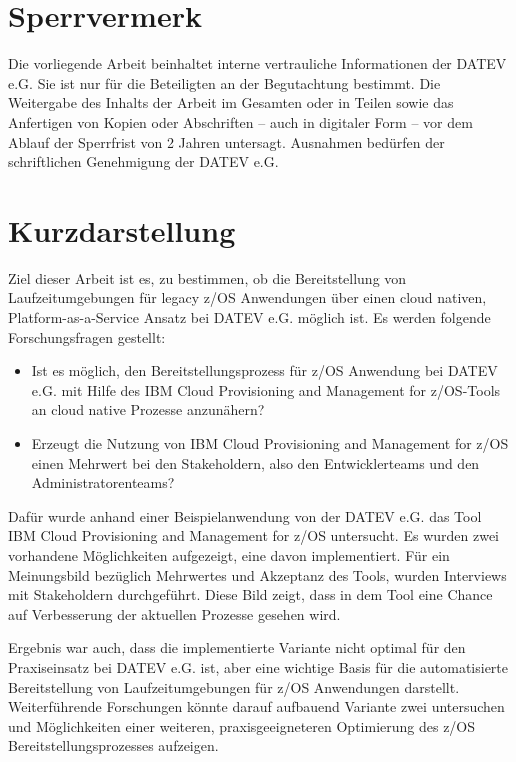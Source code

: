 \thispagestyle{empty}
\section*{Sperrvermerk}
Die vorliegende Arbeit beinhaltet interne vertrauliche Informationen der DATEV e.G.
Sie ist nur für die Beteiligten an der Begutachtung bestimmt.
Die Weitergabe des Inhalts der Arbeit im Gesamten oder in Teilen sowie das Anfertigen von Kopien oder Abschriften – auch in digitaler Form – vor dem Ablauf der Sperrfrist von 2 Jahren untersagt.
Ausnahmen bedürfen der schriftlichen Genehmigung der DATEV e.G.

\newpage
\section*{Kurzdarstellung}
\label{sec:kurzdarstellung}
Ziel dieser Arbeit ist es, zu bestimmen, ob die Bereitstellung von Laufzeitumgebungen für legacy z/OS Anwendungen über einen cloud nativen, Platform-as-a-Service Ansatz bei DATEV e.G. möglich ist.
Es werden folgende Forschungsfragen gestellt:
\begin{itemize}
\item Ist es möglich, den Bereitstellungsprozess für z/OS Anwendung bei DATEV e.G. mit Hilfe des \glqq IBM Cloud Provisioning and Management for z/OS\grqq-Tools an cloud native Prozesse anzunähern?
\item Erzeugt die Nutzung von \glqq IBM Cloud Provisioning and Management for z/OS\grqq{} einen Mehrwert bei den Stakeholdern, also den Entwicklerteams und den Administratorenteams?
\end{itemize}

Dafür wurde anhand einer Beispielanwendung von der DATEV e.G. das Tool \glqq IBM Cloud Provisioning and Management for z/OS\grqq{} untersucht.
Es wurden zwei vorhandene Möglichkeiten aufgezeigt, eine davon implementiert.
Für ein Meinungsbild bezüglich  Mehrwertes und Akzeptanz des Tools, wurden Interviews mit Stakeholdern durchgeführt.
Diese Bild zeigt, dass in dem Tool eine Chance auf Verbesserung der aktuellen Prozesse gesehen wird.

Ergebnis war auch, dass die implementierte Variante nicht optimal für den Praxiseinsatz bei DATEV e.G. ist, aber eine wichtige Basis für die automatisierte Bereitstellung von Laufzeitumgebungen für z/OS Anwendungen darstellt.
Weiterführende Forschungen könnte darauf aufbauend Variante zwei untersuchen und  Möglichkeiten einer weiteren, praxisgeeigneteren Optimierung des z/OS Bereitstellungsprozesses aufzeigen.


